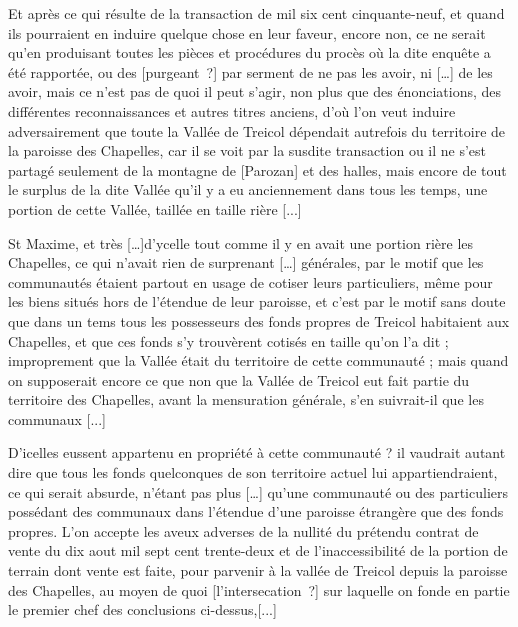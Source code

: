 \documentclass[a4paper,twoside,openany]{article}
\begin{document}

Et après ce qui résulte de la transaction de mil six cent cinquante-neuf, et quand ils pourraient en induire quelque chose en leur faveur, encore non, ce ne serait qu'en produisant toutes les pièces et procédures du procès où la dite enquête a été rapportée, ou des [purgeant~?] par serment de ne pas les avoir, ni […] de les avoir, mais ce n'est pas de quoi il peut s'agir, non plus que des énonciations, des différentes reconnaissances et autres titres anciens, d’où l'on veut induire adversairement que toute la Vallée de Treicol dépendait autrefois du territoire de la paroisse des Chapelles, car il se voit par la susdite transaction ou il ne s’est partagé seulement de la montagne de [Parozan] et des halles, mais encore de tout le surplus de la dite Vallée qu'il y a eu anciennement dans tous les temps, une portion de cette Vallée, taillée en taille rière [...]

St Maxime, et très […]d’ycelle tout comme il y en avait une portion rière les Chapelles, ce qui n’avait rien de surprenant […] générales, par le motif que les communautés étaient partout en usage de cotiser leurs particuliers, même pour les biens situés hors de l'étendue de leur paroisse, et c'est par le motif sans doute que dans un tems tous les possesseurs des fonds propres de Treicol habitaient aux Chapelles, et que ces fonds s'y trouvèrent cotisés en taille qu'on l'a dit ; improprement que la Vallée était du territoire de cette communauté ; mais quand on supposerait encore ce que non que la Vallée de Treicol eut fait partie du territoire des Chapelles, avant la mensuration générale, s'en suivrait-il que les communaux [...]


D'icelles eussent appartenu en propriété à cette communauté ? il vaudrait autant dire que tous les fonds quelconques de son territoire actuel lui appartiendraient, ce qui serait absurde, n'étant pas plus […] qu'une communauté ou des particuliers possédant des communaux dans l'étendue d'une paroisse étrangère que des fonds propres.
L'on accepte les aveux adverses de la nullité du prétendu contrat de vente du dix aout mil sept cent trente-deux et de l'inaccessibilité de la portion de terrain dont vente est faite, pour parvenir à la vallée de Treicol depuis la paroisse des Chapelles, au moyen de quoi [l’intersecation~?] sur laquelle on fonde en partie le premier chef des conclusions ci-dessus,[...]
\end{document}
